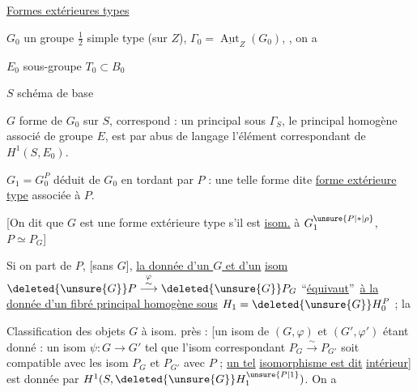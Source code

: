 \uline{Formes extérieures types}


\(G_0\) un groupe \(\tfrac12\) simple type (sur \(Z\)), \(\Gamma_0=\underline{\operatorname{Aut}}_Z(G_0)\), , on a 

\(E_0\) sous-groupe  \(T_0\subset B_0\)

\(S\) schéma de base

\(G\) forme de \(G_0\) sur \(S\), correspond : un principal   sous \(\Gamma_S\),   le principal homogène associé de groupe \(E\),  est  par abus de langage l'élément correspondant de \(H^1(S,E_0)\).


\(G_1=G_0^P\) déduit de \(G_0\) en tordant par \(P\)\inserted{ [pour l'instant, \unsure{par hypoth.|par not.} \(P=P_G\)]} : une telle  forme  dite \uline{forme extérieure type} associée à \(P\).

[On dit que \(G\) est une forme extérieure type s'il est \uline{isom.} à \(G_{1}^{\unsure{P|*|\rho}}\),    \(P\simeq P_G\)]

Si on part de \(P\), [sans \(G\)], \uline{la donnée d'un \(G\) et d'un} \uline{isom} \(\deleted{\unsure{G}}P\mathrel{\overset{\varphi}{\overset{\sim}{\longrightarrow}}}\deleted{\unsure{G}}P_G\) \textquotedblleft\uline{équivaut}\textquotedblright\ \uline{à la donnée d'un fibré principal homogène sous} \(H_1=\deleted{\unsure{G}}H_0^P\) ; la


Classification des objets \(G\) à isom. près : [un isom de \((G,\varphi)\) et \((G',\varphi')\) étant donné : un isom \(\psi:G\to G'\) tel que l'isom correspondant \(P_G\xrightarrow{\sim}P_{G'}\) soit compatible avec les isom \(P_G\) et \(P_{G'}\) avec \(P\)  ; \uline{un tel}  \uline{isomorphisme est dit} \uline{intérieur}]   est donnée par \(H^1(S,\deleted{\unsure{G}}H_{1}^{\unsure{P|1}})\). On a

